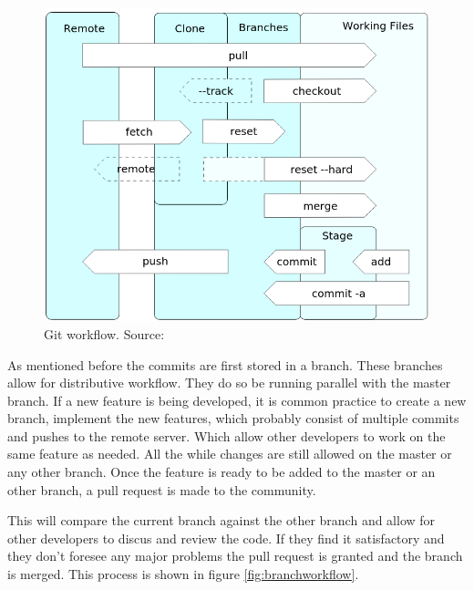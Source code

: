 \documentclass[fleqn,10pt]{SelfArx} %
\begin{document}
\begin{figure}[t]
	\includegraphics[width=\textwidth/2]{../images/githubworkflow1.png}
	\caption{Git workflow. Source: \citeauthor{_git_2015} \cite{_git_2015}}\label{fig:gitworkflow}
\end{figure}

As mentioned before the commits are first stored in a branch. These branches allow for distributive workflow. They do so be running parallel with the master branch. If a new feature is being developed, it is common practice to create a new branch, implement the new features, which probably consist of multiple commits and pushes to the remote server. Which allow other developers to work on the same feature as needed. All the while changes are still allowed on the master or any other branch. Once the feature is ready to be added to the master or an other branch, a pull request is made to the community.

This will compare the current branch against the other branch and allow for other developers to discus and review the code. If they find it satisfactory and they don't foresee any major problems the pull request is granted and the branch is merged. This process is shown in figure \ref{fig:branchworkflow}.
\end{document}
